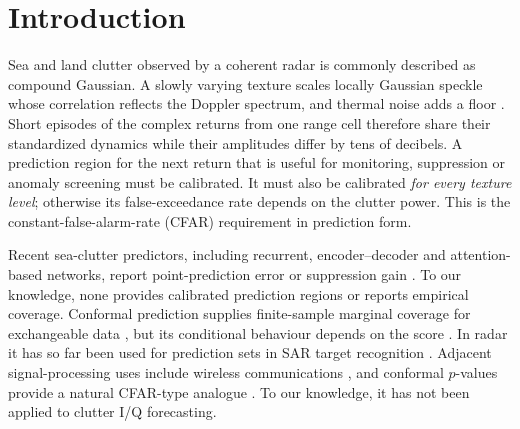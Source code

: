 \documentclass[nolineno]{ieeeaccess}
\begin{document}
\section{Introduction}
Sea and land clutter observed by a coherent radar is commonly described as compound Gaussian. A slowly varying texture scales locally Gaussian speckle whose correlation reflects the Doppler spectrum, and thermal noise adds a floor \cite{ward2013,conte1995,ollila2012}. Short episodes of the complex returns from one range cell therefore share their standardized dynamics while their amplitudes differ by tens of decibels. A prediction region for the next return that is useful for monitoring, suppression or anomaly screening must be calibrated. It must also be calibrated \emph{for every texture level}; otherwise its false-exceedance rate depends on the clutter power. This is the constant-false-alarm-rate (CFAR) requirement in prediction form.

Recent sea-clutter predictors, including recurrent, encoder--decoder and attention-based networks, report point-prediction error or suppression gain \cite{ma2019,qu2023,li2025taes}. To our knowledge, none provides calibrated prediction regions or reports empirical coverage. Conformal prediction supplies finite-sample marginal coverage for exchangeable data \cite{lei2018}, but its conditional behaviour depends on the score \cite{barber2021limits,gibbs2025,dewolf2025}. In radar it has so far been used for prediction sets in SAR target recognition \cite{spie2025}. Adjacent signal-processing uses include wireless communications \cite{cohen2023}, and conformal $p$-values provide a natural CFAR-type analogue \cite{bates2023}. To our knowledge, it has not been applied to clutter I/Q forecasting.
\end{document}
